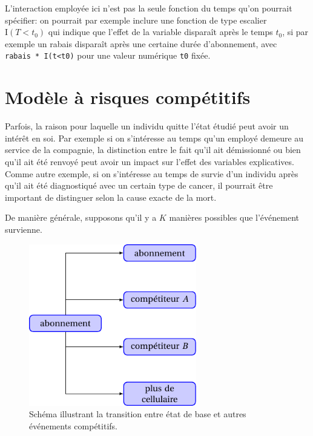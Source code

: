 \documentclass[
  11pt,
  letterpaper,
]{scrbook}
\theoremstyle{definition}
\theoremstyle{remark}
\begin{document}
L'interaction employée ici n'est pas la seule fonction du temps qu'on
pourrait spécifier: on pourrait par exemple inclure une fonction de type
escalier \(\mathrm{I}(T< t_0)\) qui indique que l'effet de la variable
disparaît après le temps \(t_0\), si par exemple un rabais disparaît
après une certaine durée d'abonnement, avec
\texttt{rabais\ *\ I(t\textless{}t0)} pour une valeur numérique
\texttt{t0} fixée.

\hypertarget{moduxe8le-uxe0-risques-compuxe9titifs}{%
\section{Modèle à risques
compétitifs}\label{moduxe8le-uxe0-risques-compuxe9titifs}}

Parfois, la raison pour laquelle un individu quitte l'état étudié peut
avoir un intérêt en soi. Par exemple si on s'intéresse au temps qu'un
employé demeure au service de la compagnie, la distinction entre le fait
qu'il ait démissionné ou bien qu'il ait été renvoyé peut avoir un impact
sur l'effet des variables explicatives. Comme autre exemple, si on
s'intéresse au temps de survie d'un individu après qu'il ait été
diagnostiqué avec un certain type de cancer, il pourrait être important
de distinguer selon la cause exacte de la mort.

De manière générale, supposons qu'il y a \(K\) manières possibles que
l'événement survienne.

\begin{figure}[ht!]

{\centering \includegraphics[width=0.65\textwidth,height=\textheight]{./figures/transition_etats_modele_risque_competitifs.pdf}

}

\caption{\label{fig-transitionetat}Schéma illustrant la transition entre
état de base et autres événements compétitifs.}

\end{figure}
\end{document}
